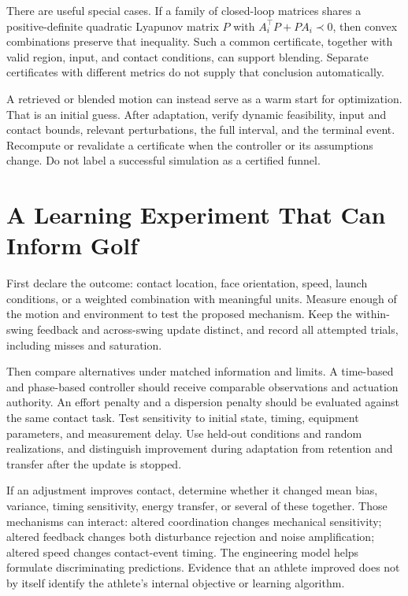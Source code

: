 \documentclass[12pt, openany]{book}
\theoremstyle{plain}
\begin{document}
There are useful special cases. If a family of closed-loop matrices shares a positive-definite quadratic Lyapunov matrix $P$ with $A_i^\top P+PA_i\prec0$, then convex combinations preserve that inequality. Such a common certificate, together with valid region, input, and contact conditions, can support blending. Separate certificates with different metrics do not supply that conclusion automatically.

A retrieved or blended motion can instead serve as a warm start for optimization. That is an initial guess. After adaptation, verify dynamic feasibility, input and contact bounds, relevant perturbations, the full interval, and the terminal event. Recompute or revalidate a certificate when the controller or its assumptions change. Do not label a successful simulation as a certified funnel.

\section{A Learning Experiment That Can Inform Golf}

First declare the outcome: contact location, face orientation, speed, launch conditions, or a weighted combination with meaningful units. Measure enough of the motion and environment to test the proposed mechanism. Keep the within-swing feedback and across-swing update distinct, and record all attempted trials, including misses and saturation.

Then compare alternatives under matched information and limits. A time-based and phase-based controller should receive comparable observations and actuation authority. An effort penalty and a dispersion penalty should be evaluated against the same contact task. Test sensitivity to initial state, timing, equipment parameters, and measurement delay. Use held-out conditions and random realizations, and distinguish improvement during adaptation from retention and transfer after the update is stopped.

If an adjustment improves contact, determine whether it changed mean bias, variance, timing sensitivity, energy transfer, or several of these together. Those mechanisms can interact: altered coordination changes mechanical sensitivity; altered feedback changes both disturbance rejection and noise amplification; altered speed changes contact-event timing. The engineering model helps formulate discriminating predictions. Evidence that an athlete improved does not by itself identify the athlete's internal objective or learning algorithm.
\end{document}
